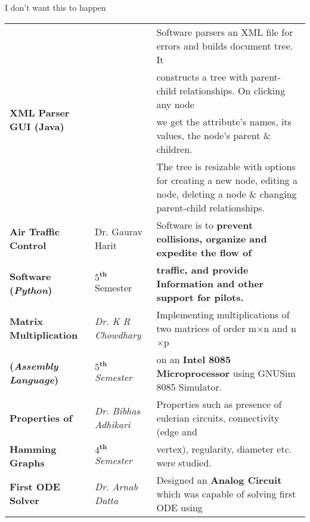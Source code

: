 \documentclass[a4paper,10pt]{extarticle}
\begin{document}
\begin{mybox}
\iffalse
I don't want this to happen
\begin{tabular}[H]{|p{3.5cm}|>{\centering\arraybackslash}p{3.5cm}|p{10cm}|}
\hline
\multirow{4}{*}{\setmainfont{Calibri Bold.ttf}\textbf{XML Parser GUI (Java)}} & \multirow{4}{*}{Dr. Gaurav Harit} & Software parsers an XML file for errors and builds document tree. It \\
 & \multirow{4}{*}{$5^{\mathbf{th}}$ Semester} & constructs a tree with parent-child relationships. On clicking any node\\
& & we get the attribute's names, its values, the node's parent \& children. \\ 
& & The tree is resizable with options for creating a new node, editing a node, deleting a node \& changing parent-child relationships.\\ \hline
\setmainfont{Calibri Bold.ttf}\textbf{Air Traffic Control} & Dr. Gaurav Harit & Software is to \textbf{prevent collisions, organize and expedite the flow of}\\
\setmainfont{Calibri Bold.ttf}\textbf{Software (\textit{Python})} & $5^{\mathbf{th}}$ Semester & \textbf{traffic, and provide Information and other support for pilots.}\\ \hline
\setmainfont{Calibri Bold.ttf}\textbf{Matrix Multiplication} &	\textit{Dr. K R Chowdhary} &	Implementing multiplications of two matrices of order m$\times$n and n$\times$p \\ 
\setmainfont{Calibri Bold.ttf}\textbf{(\textit{Assembly Language})} &  $5^{\mathbf{th}}$ \textit{Semester} & on an \textbf{Intel 8085 Microprocessor} using GNUSim 8085 Simulator.\\ \hline
\setmainfont{Calibri Bold.ttf}\textbf{Properties of} &	\textit{Dr. Bibhas Adhikari}&	Properties such as presence of eulerian circuits, connectivity (edge and \\ 
\setmainfont{Calibri Bold.ttf}\textbf{Hamming Graphs} &  $4^{\mathbf{th}}$ \textit{Semester} & vertex), regularity, diameter etc. were studied.\\ \hline
\multirow{2}{*}{\setmainfont{Calibri Bold.ttf}\textbf{First ODE Solver}} &	\textit{Dr. Arnab Datta} &	Designed an \textbf{Analog Circuit} which was capable of solving first ODE using\\

\end{tabular}
\end{mybox}
\end{document}
